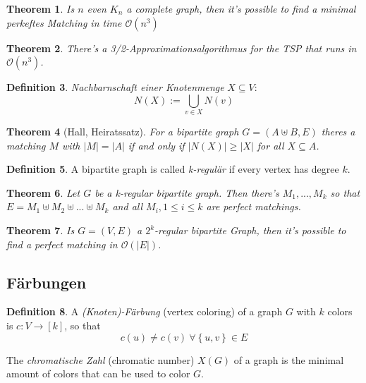 \documentclass[12pt]{extarticle}
\theoremstyle{definition}
\newtheorem{definition}{Definition}[section]
\theoremstyle{remark}
\theoremstyle{plain}
\newtheorem{theorem}[definition]{Theorem}
\theoremstyle{plain}
\theoremstyle{plain}
\newcommand{\BO}{\mathcal{O}}
\begin{document}
\begin{theorem}
    Is $n$ even $K_n$ a complete graph, then it's possible to find a \textit{minimal perkeftes Matching} in time $\BO(n^3)$
\end{theorem}

\begin{theorem}
    There's a 3/2-Approximationsalgorithmus for the TSP that runs in $\BO(n^3)$.
\end{theorem}

\begin{definition}
    \textit{Nachbarnschaft einer Knotenmenge} $X \subseteq V$:
    \[ N(X) := \bigcup_{v \in X} N(v) \]
\end{definition}

\begin{theorem}[Hall, Heiratssatz]
    For a bipartite graph $G = (A \uplus B, E)$ theres a matching $M$ with $|M| = |A|$ if and only if $|N(X)| \ge |X|$ for all $X \subseteq A$.
\end{theorem}

\begin{definition}
    A bipartite graph is called \textit{k-regulär} if every vertex has degree $k$.
\end{definition}

\begin{theorem}
    Let $G$ be a k-regular bipartite graph. Then there's $M_1, ..., M_k$ so that $E = M_1 \uplus M_2 \uplus ... \uplus M_k$ and all
    $M_i, 1 \le i \le k$ are perfect matchings.
\end{theorem}

\begin{theorem}
    Is $G = (V, E)$ a $2^k$-regular bipartite Graph, then it's possible to find a perfect matching in $\BO(|E|)$.
\end{theorem}

\subsection{Färbungen}

\begin{definition}
    A \textit{(Knoten)-Färbung} (vertex coloring) of a graph $G$ with $k$ colors is $c: V \to [k]$, so that
    \[ c(u) \ne c(v)\ \forall \left\{ u, v \right\} \in E \]

    The \textit{chromatische Zahl} (chromatic number) $X(G)$ of a graph is the minimal amount of colors that can be used to
    color $G$.
\end{definition}
\end{document}
